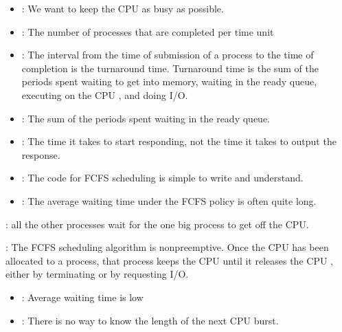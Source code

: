   \begin{itemize}
    \item {}: We want to keep the CPU as busy as possible.
    \item {}: The number of processes that are completed per time unit
    \item {}: The interval from the time of submission of a process to the time of completion is the turnaround time. Turnaround time is the sum of the periods spent waiting to get into memory, waiting in the ready queue, executing on the CPU , and doing I/O.
    \item {}: The sum of the periods spent waiting in the ready queue.
    \item {}: The time it takes to start responding, not the time it takes to output the response.
  \end{itemize}

    \begin{itemize}
      \item {}: The code for FCFS scheduling is simple to write and understand.
      \item {}: The average waiting time under the FCFS policy is often quite long.
    \end{itemize}


    \par {}: all the other processes wait for the one big process to get off the CPU.
    \par {}: The FCFS scheduling algorithm is nonpreemptive. Once the CPU has been allocated to a process, that process keeps the CPU until it releases the CPU , either by terminating or by requesting I/O. 

    \begin{itemize}
      \item {}: Average waiting time is low
      \item {}: There is no way to know the length of the next CPU burst.
    \end{itemize}


